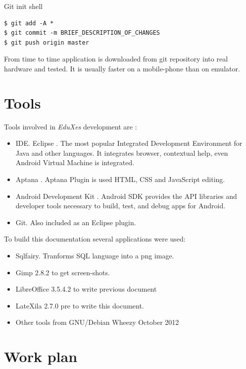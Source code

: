   \begin{bclogo}[couleur=green!30,arrondi=0.1, logo=\bcpanchant,  ombre=true ] 
{Git init shell}   
\begin{verbatim}
$ git add -A *
$ git commit -m BRIEF_DESCRIPTION_OF_CHANGES 
$ git push origin master
\end{verbatim}
\end{bclogo}

	  From time to time application is downloaded from git repository into real hardware and tested. It is usually faster on 
	  a mobile-phone than on emulator. 
	    
		\section{Tools}
	
	Tools involved in \emph{EduXes} development are :
	\begin{itemize}
	    \item IDE. Eclipse \cite{Eclipse}. The most popular Integrated Development Environment for Java and other languages. 
	    It integrates  browser, contextual help, even Android Virtual Machine is integrated.
	    \item Aptana \cite{Aptana}. Aptana Plugin is used  HTML, CSS and JavaScript editing. 
	    \item Android Development Kit \cite{AndroidDevelopmentKit}.  Android SDK provides  the API libraries and developer tools necessary to build, test, and debug apps for Android.  
	    \item Git. Also included as an Eclipse plugin.
	\end{itemize}
	To build this documentation several applications were used:
\begin{itemize}
    \item Sqlfairy. Tranforms SQL language into a  png image.
    \item Gimp 2.8.2 to get screen-shots.
    \item LibreOffice 3.5.4.2 to write previous document 
    \item LateXila 2.7.0 pre  to write this document.
    \item Other tools from GNU/Debian Wheezy October 2012    
\end{itemize}


	
\section {Work plan}

